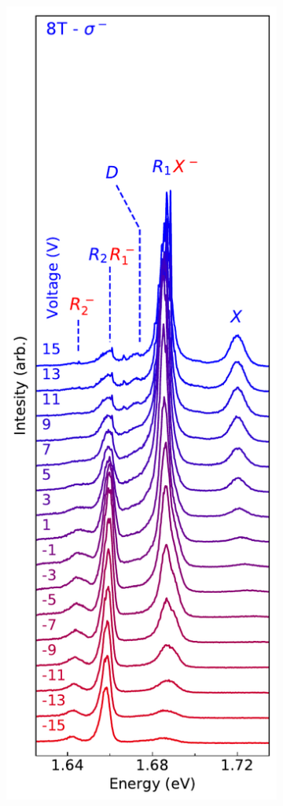 \begin{figure}[t]
\begin{subfigure}{0.32\textwidth}
	\end{subfigure}
	\begin{subfigure}{0.32\textwidth}
		\caption{}
		\includegraphics[width=\textwidth]{waterfall_8T_sm}

\end{subfigure}
\end{figure}
